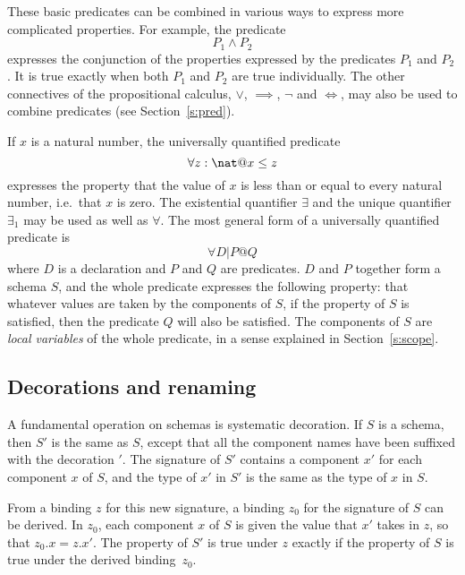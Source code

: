These basic predicates can be combined in various ways to express
more complicated properties. For example, the predicate
\[ P_1 \land P_2 \]
expresses the conjunction
of the properties expressed by the predicates $P_1$ and $P_2$. It is
true exactly when both $P_1$ and $P_2$ are true individually. The
other connectives of the propositional calculus, $\lor$, $\implies$,
$\neg$ and $\iff$, may also be used to combine predicates (see
Section~\ref{s:pred}).

If $x$ is a natural number, the universally quantified%
predicate
\[ \forall z: \nat @ x \leq z \]
expresses the property that the value of $x$ is less than or equal
to every natural number, i.e.\ that $x$ is zero. The existential
quantifier $\exists$ 
and the unique quantifier 
$\exists_1$ may be used as well as $\forall$.
The most general form of a universally quantified predicate is
\[ \forall D | P @ Q \]
where $D$ is a declaration and $P$ and $Q$ are predicates. $D$
and $P$ together form a schema $S$, and the whole predicate expresses
the following property: that whatever values are taken by the
components of $S$, if the property of $S$ is satisfied, then the
predicate $Q$ will also be satisfied. The components of $S$ are
{\em local variables\/}
of the whole predicate, in a sense explained in Section~\ref{s:scope}.

\subsection{Decorations and renaming}\label{ss:decor}

\new A fundamental operation on schemas is systematic
decoration.  If $S$ is a schema, then $S'$ is
the same as $S$, except that all the component names have been
suffixed with the decoration ${}'$. The signature of $S'$ contains a
component $x'$ for each component $x$ of $S$, and the type of $x'$
in $S'$ is the same as the type of $x$ in $S$.

\new From a binding $z$ for this new signature, a binding $z_0$ for the
signature of $S$ can be derived.
In $z_0$, each component $x$ of $S$ is given the value that $x'$
takes in $z$, so that $z_0.x = z.x'$.
The property of $S'$ is true under $z$ exactly if the property of
$S$ is true under the derived binding~$z_0$.

